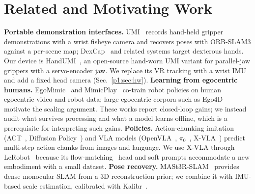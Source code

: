\documentclass[conference,10pt]{IEEEtran}
\begin{document}
\section{Related and Motivating Work}
\textbf{Portable demonstration interfaces.} UMI~\cite{chi2024umi} records hand-held gripper demonstrations with a wrist fisheye
camera and recovers poses with ORB-SLAM3 against a per-scene map; DexCap~\cite{wang2024dexcap} and related systems target dexterous
hands. Our device is HandUMI~\cite{handumi_hw}, an open-source hand-worn UMI variant for parallel-jaw grippers with a
servo-encoder jaw. We replace its VR tracking with a wrist IMU and add a fixed head camera (Sec.~\ref{p1:sec:hw}).
\textbf{Learning from egocentric humans.} EgoMimic~\cite{kareer2024egomimic} and MimicPlay~\cite{wang2023mimicplay} co-train robot
policies on human egocentric video and robot data; large egocentric corpora such as Ego4D~\cite{grauman2022ego4d} motivate the
scaling argument. These works report closed-loop gains; we instead audit what survives processing and what a model learns
offline, which is a prerequisite for interpreting such gains.
\textbf{Policies.} Action-chunking imitation (ACT~\cite{zhao2023act}, Diffusion Policy~\cite{chi2023diffusion}) and VLA models
(OpenVLA~\cite{kim2024openvla}, $\pi_0$~\cite{black2024pi0}, X-VLA~\cite{zheng2025xvla}) predict multi-step action chunks from
images and language. We use X-VLA through LeRobot~\cite{cadene2024lerobot} because its flow-matching~\cite{lipman2023flow} head
and soft prompts accommodate a new embodiment with a small dataset.
\textbf{Pose recovery.} MASt3R-SLAM~\cite{murai2025mast3rslam} provides dense monocular SLAM from a 3D reconstruction prior; we
combine it with IMU-based scale estimation, calibrated with Kalibr~\cite{furgale2013kalibr}.
\end{document}
